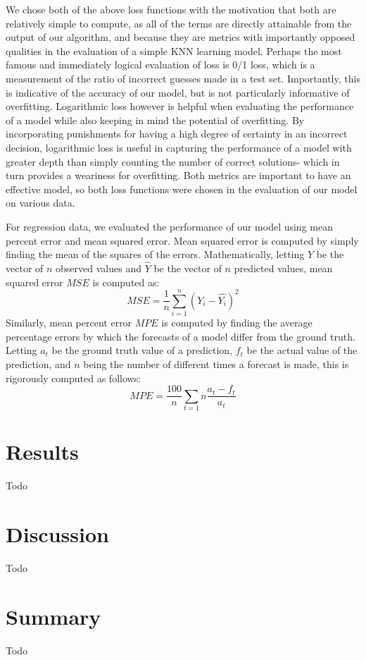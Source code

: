 \documentclass[twoside,11pt]{article}
\begin{document}
We chose both of the above loss functions with the motivation that both are relatively simple to compute, as all of the terms are directly attainable from the output of our algorithm, and
because they are metrics with importantly opposed qualities in the evaluation of a simple KNN learning model. Perhaps the most famous and immediately logical evaluation of loss is 0/1 loss, 
which is a measurement of the ratio of incorrect guesses made in a test set. Importantly, this is indicative of the accuracy of our model, but is not particularly informative of overfitting.
Logarithmic loss however is helpful when evaluating the performance of a model while also keeping in mind the potential of overfitting. By incorporating punishments for having a high degree
of certainty in an incorrect decision, logarithmic loss is useful in capturing the performance of a model with greater depth than simply counting the number of correct solutions- 
which in turn provides a weariness for overfitting.
Both metrics are important to have an effective model, so both loss functions were chosen in the evaluation of our model on various data.

For regression data, we evaluated the performance of our model using mean percent error and mean squared error. Mean squared error is computed by
simply finding the mean of the squares of the errors. Mathematically, letting $Y$ be the vector of $n$ observed values and $\hat{Y}$ be the vector of $n$ predicted
values, mean squared error $MSE$ is computed as:
\begin{equation}
MSE = \frac{1}{n} \sum_{i=1}^{n} (Y_i - \hat{Y_i})^2
\end{equation}
Similarly, mean percent error $MPE$ is computed by finding the average percentage errors by which the forecasts of a model differ from the ground truth. Letting $a_t$ be the 
ground truth value of a prediction, $f_t$ be the actual value of the prediction, and $n$ being the number of different times a forecast is made, this is rigorously
computed as follows:
\begin{equation}
MPE = \frac{100}{n} \sum_{t=1}{n} \frac{a_t - f_t}{a_t}
\end{equation}


\section{Results}
Todo

\section{Discussion}
Todo


\section{Summary}
Todo
\end{document}
